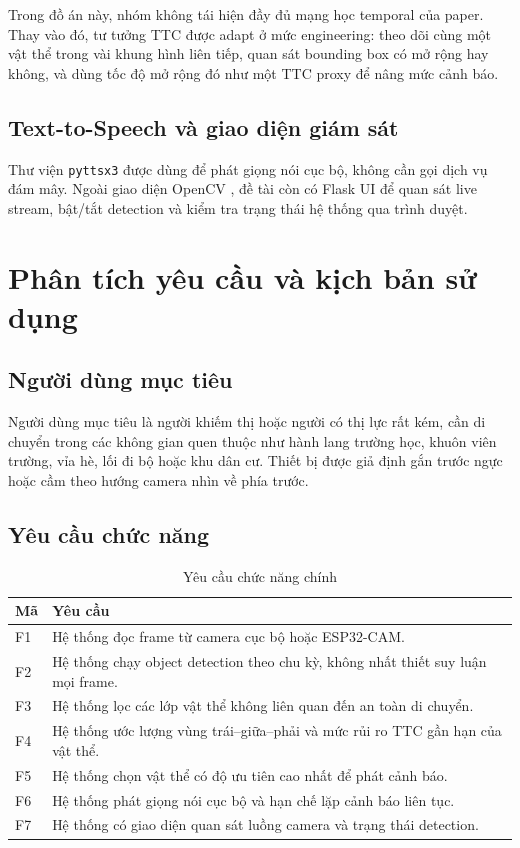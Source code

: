 \documentclass[twoside,final]{hcmut-report}
\begin{document}
Trong đồ án này, nhóm không tái hiện đầy đủ mạng học temporal của paper. Thay vào đó, tư tưởng TTC được adapt ở mức engineering: theo dõi cùng một vật thể trong vài khung hình liên tiếp, quan sát bounding box có mở rộng hay không, và dùng tốc độ mở rộng đó như một TTC proxy để nâng mức cảnh báo.

\subsection{Text-to-Speech và giao diện giám sát}
Thư viện \texttt{pyttsx3} được dùng để phát giọng nói cục bộ, không cần gọi dịch vụ đám mây. Ngoài giao diện OpenCV \citep{opencv}, đề tài còn có Flask UI \citep{flask} để quan sát live stream, bật/tắt detection và kiểm tra trạng thái hệ thống qua trình duyệt.

\section{Phân tích yêu cầu và kịch bản sử dụng}

\subsection{Người dùng mục tiêu}
Người dùng mục tiêu là người khiếm thị hoặc người có thị lực rất kém, cần di chuyển trong các không gian quen thuộc như hành lang trường học, khuôn viên trường, vỉa hè, lối đi bộ hoặc khu dân cư. Thiết bị được giả định gắn trước ngực hoặc cầm theo hướng camera nhìn về phía trước.

\subsection{Yêu cầu chức năng}
\begin{table}[H]
  \centering
  \caption{Yêu cầu chức năng chính}
  \label{tab:functional-requirements}
  \begin{tabularx}{\textwidth}{L{2.2cm}Y}
    \toprule
    \textbf{Mã} & \textbf{Yêu cầu} \\
    \midrule
    F1 & Hệ thống đọc frame từ camera cục bộ hoặc ESP32-CAM. \\
    F2 & Hệ thống chạy object detection theo chu kỳ, không nhất thiết suy luận mọi frame. \\
    F3 & Hệ thống lọc các lớp vật thể không liên quan đến an toàn di chuyển. \\
    F4 & Hệ thống ước lượng vùng trái--giữa--phải và mức rủi ro TTC gần hạn của vật thể. \\
    F5 & Hệ thống chọn vật thể có độ ưu tiên cao nhất để phát cảnh báo. \\
    F6 & Hệ thống phát giọng nói cục bộ và hạn chế lặp cảnh báo liên tục. \\
    F7 & Hệ thống có giao diện quan sát luồng camera và trạng thái detection. \\
    \bottomrule
  \end{tabularx}
\end{table}
\end{document}
